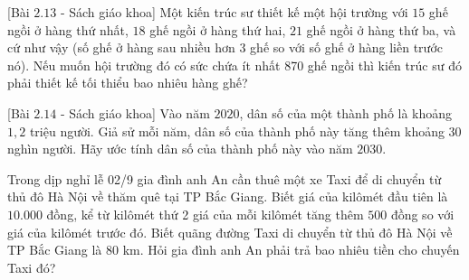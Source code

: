 \begin{bt}%
[Bài $2.13$ - Sách giáo khoa]%
	Một kiến trúc sư thiết kế một hội trường với $15$ ghế ngồi ở hàng thứ nhất, $18$ ghế ngồi ở hàng thứ hai, $21$ ghế ngồi ở hàng thứ ba, và cứ như vậy (số ghế ở hàng sau nhiều hơn $3$ ghế so với số ghế ở hàng liền trước nó). Nếu muốn hội trường đó có sức chứa ít nhất 870 ghế ngồi thì kiến trúc sư đó phải thiết kế tối thiểu bao nhiêu hàng ghế?
\end{bt}

\begin{bt}%
[Bài $2.14$ - Sách giáo khoa]%
	Vào năm $2020$, dân số của một thành phố là khoảng $1{,}2$ triệu người. Giả sử mỗi năm, dân số của thành phố này tăng thêm khoảng $30$ nghìn người. Hãy ước tính dân số của thành phố này vào năm $2030$.
\end{bt}

\begin{bt}%

Trong dịp nghỉ lễ 02/9 gia đình anh An cần thuê một xe Taxi để di chuyển từ thủ đô Hà Nội về thăm quê tại TP Bắc Giang. Biết giá của kilômét đầu tiên là $10.000$ đồng, kể từ kilômét thứ 2 giá của mỗi kilômét tăng thêm $500$ đồng so với giá của kilômét trước đó. Biết quãng đường Taxi di chuyển từ thủ đô Hà Nội về TP Bắc Giang là $80$ km. Hỏi gia đình anh An phải trả bao nhiêu tiền cho chuyến Taxi đó?
\end{bt}

